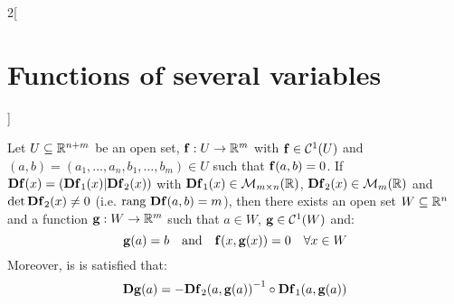 \documentclass[../../../main.tex]{subfiles}
\begin{document}
\begin{multicols}{2}[\section{Functions of several variables}]
\begin{theorem}
    Let $U\subseteq\mathbb{R}^{n+m}$ be an open set, $\boldsymbol{\mathrm{f}}:U\rightarrow\mathbb{R}^m$ with $\boldsymbol{\mathrm{f}}\in \mathcal{C}^1(U)$ and $(a,b)=(a_1,\ldots,a_n,b_1,\ldots,b_m)\in U$ such that $\boldsymbol{\mathrm{f}}(a,b)=0$. If $\boldsymbol{\mathrm{D}}\boldsymbol{\mathrm{f}}(x)=(\boldsymbol{\mathrm{D}}\boldsymbol{\mathrm{f}}_1(x)|\boldsymbol{\mathrm{D}}\boldsymbol{\mathrm{f}}_2(x))$ with $\boldsymbol{\mathrm{D}}\boldsymbol{\mathrm{f}}_1(x)\in\mathcal{M}_{m\times n}(\mathbb{R} )$, $\boldsymbol{\mathrm{D}}\boldsymbol{\mathrm{f}}_2(x)\in\mathcal{M}_m(\mathbb{R} )$ and $\det \boldsymbol{\mathrm{Df}}_2(x)\ne 0$ (i.e. $\text{rang }\boldsymbol{\mathrm{Df}}(a,b)=m$), then there exists an open set $W\subseteq\mathbb{R}^n$ and a function $\boldsymbol{\mathrm{g}}:W\rightarrow\mathbb{R}^m$ such that $a\in W$, $\boldsymbol{\mathrm{g}}\in\mathcal{C}^1(W)$ and: $$\boldsymbol{\mathrm{g}}(a)=b\quad\text{and}\quad \boldsymbol{\mathrm{f}}(x,\boldsymbol{\mathrm{g}}(x))=0\quad\forall x\in W$$ Moreover, is is satisfied that: $$\boldsymbol{\mathrm{Dg}}(a)=-{\boldsymbol{\mathrm{Df}}_2(a,\boldsymbol{\mathrm{g}}(a))}^{-1}\circ \boldsymbol{\mathrm{Df}}_1(a,\boldsymbol{\mathrm{g}}(a))$$
  \end{theorem}

\end{multicols}
\end{document}
